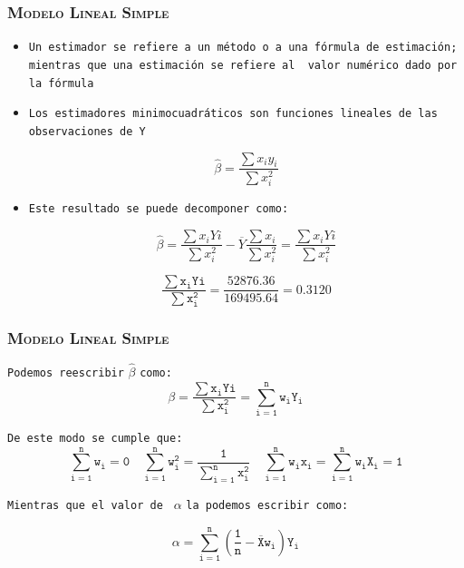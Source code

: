 \documentclass[16.5pt]{beamer}
\begin{document}
{
\begin{frame}
\frametitle{\textsc{Modelo Lineal Simple}}
\hspace*{-5mm}
\vspace*{-5mm} 
\begin{itemize}
\item \texttt{Un estimador se refiere a un método o a una {\color{blue}fórmula de estimación}; mientras que una estimación se refiere al {\color{blue} valor numérico dado por la fórmula}}
\item \texttt{Los estimadores minimocuadráticos son {\color{blue}funciones lineales de las observaciones de Y}}

$$\hat\beta = \frac{\sum x_i y_i}{\sum x_i^2} $$

\item \texttt{Este resultado se puede decomponer como:}

$$\hat\beta = \frac{\sum x_i Yi}{\sum x_i^2} - \overline{Y}\frac{\sum x_i }{\sum x_i^2}  = \frac{\sum x_i Yi}{\sum x_i^2}  $$

$$\mathtt{ \frac{\sum x_i Yi}{\sum x_i^2}=\frac{52876.36}{169495.64}=0.3120}$$


\end{itemize}
\end{frame}
}


{
\begin{frame}
\frametitle{\textsc{Modelo Lineal Simple}}
\hspace*{-5mm}
\vspace*{-5mm} 

\texttt{Podemos reescribir} $\mathtt{\hat\beta}$ \texttt{como:}
$$\mathtt{ \beta = \frac{\sum x_i Yi}{\sum x_i^2}=\sum_{i=1}^n w_i Y_i}$$

\texttt{De este modo se cumple que:}
$$\mathtt{ \sum_{i=1}^n w_i=0 \quad  \sum_{i=1}^n w_i^2=\frac{1}{\sum_{i=1}^n x_i^2} \quad   \sum_{i=1}^n w_ix_i =  \sum_{i=1}^n w_iX_i = 1}$$

\texttt{Mientras que el valor de } $\mathtt{\alpha}$ \texttt{la podemos escribir como:}

$$\mathtt{ \alpha = \sum_{i=1}^n ( \frac{1}{n} -\overline{X} w_i ) Y_i}$$

\end{frame}
}
\end{document}
